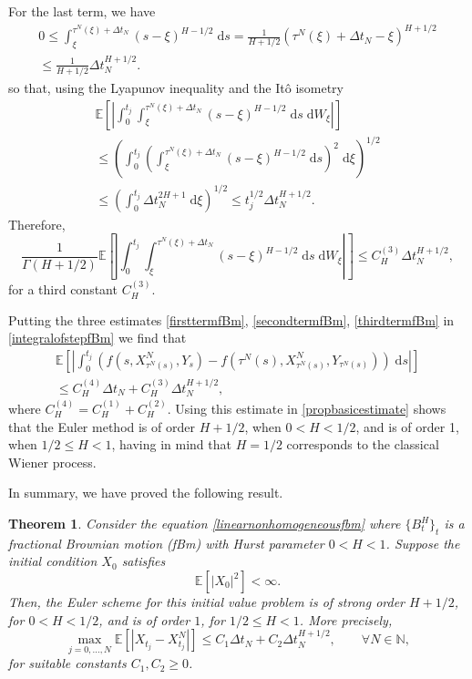 \documentclass[reqno,12pt]{amsart}
\theoremstyle{plain} %
\newtheorem{theorem}{Theorem}[section]
\theoremstyle{definition} %
\begin{document}
For the last term, we have
\begin{multline*}
    0 \leq \int_\xi^{\tau^N(\xi) + \Delta t_N} (s - \xi)^{H-1/2} \;\mathrm{d}s = \frac{1}{H + 1/2} (\tau^N(\xi) + \Delta t_N - \xi)^{H + 1/2} \\
    \leq \frac{1}{H + 1/2} \Delta t_N^{H + 1/2}.
\end{multline*}
so that, using the Lyapunov inequality and the It\^o isometry
\begin{multline*}
    \mathbb{E}\left[\left|\int_0^{t_j} \int_\xi^{\tau^N(\xi) + \Delta t_N} (s - \xi)^{H-1/2} \;\mathrm{d}s \;\mathrm{d}W_\xi\right|\right] \\
    \leq \left( \int_0^{t_j} \left(\int_\xi^{\tau^N(\xi) + \Delta t_N} (s - \xi)^{H-1/2} \;\mathrm{d}s\right)^2 \;\mathrm{d}\xi\right)^{1/2} \\ 
    \leq \left( \int_0^{t_j} \Delta t_N^{2H + 1} \;\mathrm{d}\xi\right)^{1/2} \leq t_j^{1/2} \Delta t_N^{H + 1/2}.
\end{multline*}
Therefore,
\begin{equation}
    \label{thirdtermfBm}
    \frac{1}{\Gamma(H + 1/2)}\mathbb{E}\left[\left|\int_0^{t_j} \int_\xi^{\tau^N(\xi) + \Delta t_N} (s - \xi)^{H-1/2} \;\mathrm{d}s \;\mathrm{d}W_\xi\right|\right] \leq C_H^{(3)} \Delta t_N^{H + 1/2},
\end{equation}
for a third constant $C_H^{(3)}$.

Putting the three estimates \eqref{firsttermfBm}, \eqref{secondtermfBm}, \eqref{thirdtermfBm} in \eqref{integralofstepfBm} we find that
\begin{multline}
    \mathbb{E}\left[\left|\int_0^{t_j} \left( f(s, X_{\tau^N(s)}^N, Y_s) - f(\tau^N(s), X_{\tau^N(s)}^N, Y_{\tau^N(s)}) \right)\;\mathrm{d}s\right|\right] \\
    \leq C_H^{(4)} \Delta t_N + C_H^{(3)} \Delta t_N^{H + 1/2},
\end{multline}
where $C_H^{(4)} = C_H^{(1)} + C_H^{(2)}$. Using this estimate in \cref{propbasicestimate} shows that the Euler method is of order $H + 1/2$, when $0 < H < 1/2$, and is of order 1, when $1/2 \leq H < 1$, having in mind that $H=1/2$ corresponds to the classical Wiener process.

In summary, we have proved the following result.
\begin{theorem}
    Consider the equation \eqref{linearnonhomogeneousfbm} where $\{B^H_t\}_t$ is a fractional Brownian motion (fBm) with Hurst parameter $0 < H < 1$. Suppose the initial condition $X_0$ satisfies
    \begin{equation}
        \label{EX0square2b}
        \mathbb{E}[|X_0|^2] < \infty.
    \end{equation}
    Then, the Euler scheme for this initial value problem is of strong order $H+1/2$, for $0 < H < 1/2$, and is of order $1$, for $1/2 \leq H < 1$. More precisely,
    \begin{equation}
        \max_{j=0, \ldots, N}\mathbb{E}\left[ \left| X_{t_j} - X_{t_j}^N \right| \right] \leq C_1 \Delta t_N + C_2 \Delta t_N^{H + 1/2}, \qquad \forall N \in \mathbb{N},
    \end{equation}
    for suitable constants $C_1, C_2 \geq 0$.
\end{theorem}
\end{document}
